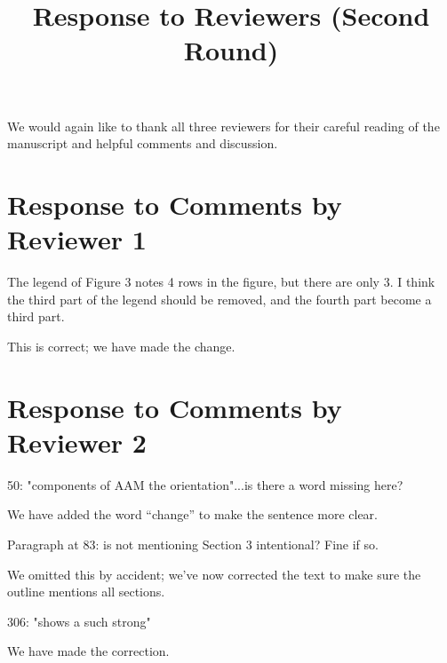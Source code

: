 \documentclass[a4paper,10pt]{article}
\title{Response to Reviewers  (Second Round)}
\author{}
\begin{document}
%



\maketitle


We would again like to thank all three reviewers for their careful reading of the manuscript and helpful comments and discussion.


\section{Response to Comments by Reviewer 1}
\label{sec:R1}


\textcolor{reviewer}{The legend of Figure 3 notes 4 rows in the figure, but there are only 3. I think the third part of the legend should be removed, and the fourth part become a third part. }
\vspace{0.5cm}

This is correct; we have made the change.
\vspace{0.5cm}

\section{Response to Comments by Reviewer 2}
\label{sec:R2}



\textcolor{reviewer}{50: "components of AAM the orientation"...is there a word missing here?}
\vspace{0.5cm}

We have added the word ``change'' to make the sentence more clear.  
\vspace{0.5cm}

\noindent \textcolor{reviewer}{Paragraph at 83: is not mentioning Section 3 intentional? Fine if so.}
\vspace{0.5cm}

We omitted this by accident; we've now corrected the text to make sure the outline mentions all sections.
\vspace{0.5cm}


\noindent \textcolor{reviewer}{306: "shows a such strong"}
\vspace{0.5cm}

We have made the correction.
\vspace{0.5cm}
\end{document}
